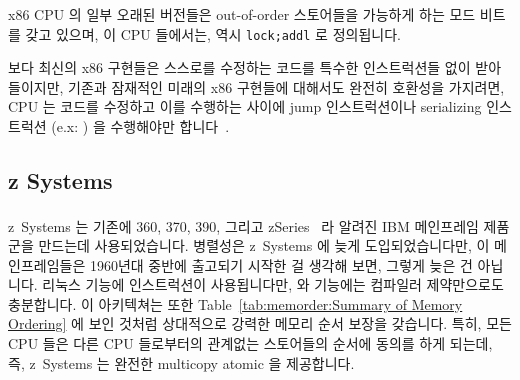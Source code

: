 x86 CPU 의 일부 오래된 버전들은 out-of-order 스토어들을 가능하게 하는 모드
비트를 갖고 있으며, 이 CPU 들에서는,  역시 {\tt lock;addl} 로
정의됩니다.

보다 최신의 x86 구현들은 스스로를 수정하는 코드를 특수한 인스트럭션들 없이
받아들이지만, 기존과 잠재적인 미래의 x86 구현들에 대해서도 완전히 호환성을
가지려면, CPU 는 코드를 수정하고 이를 수행하는 사이에 jump 인스트럭션이나
serializing 인스트럭션 (e.x: ) 을 수행해야만 합니다~\cite[Section
8.1.3]{Intel64IA32v3A2011}.

\subsection{z Systems}

z~Systems 는 기존에 360, 370, 390, 그리고 zSeries~\cite{IBMzSeries04a} 라
알려진 IBM\textsuperscript{\texttrademark} 메인프레임 제품군을 만드는데
사용되었습니다.
병렬성은 z~Systems 에 늦게 도입되었습니다만, 이 메인프레임들은 1960년대 중반에
출고되기 시작한 걸 생각해 보면, 그렇게 늦은 건 아닙니다.
리눅스  기능에  인스트럭션이 사용됩니다만,  와  기능에는 컴파일러 제약만으로도 충분합니다.
이 아키텍쳐는 또한
Table~\ref{tab:memorder:Summary of Memory Ordering}
에 보인 것처럼 상대적으로 강력한 메모리 순서 보장을 갖습니다.
특히, 모든 CPU 들은 다른 CPU 들로부터의 관계없는 스토어들의 순서에 동의를 하게 되는데, 즉, z~Systems 는 완전한 multicopy atomic 을 제공합니다.

